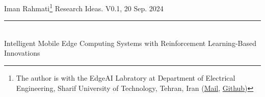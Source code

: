 \documentclass[12pt]{article}
\newcommand{\soptitle}{Intelligent Mobile Edge Computing Systems with Reinforcement Learning-Based Innovations}
\newcommand{\yourname}{Iman Rahmati}
\begin{document}
	

	
%


\begin{center} 
	
		\vspace{-17mm}
	
	\large Iman Rahmati\footnote{The author is with the EdgeAI Labratory at Department of Electrical Engineering, Sharif University of Technology, Tehran, Iran (\href{mailto:iman.rahmati@sharif.edu}{Mail}, \href{https://github.com/ImanRHT}{Github})} \hfill Research Ideas. V0.1, 20 Sep. 2024 \vspace{1mm} \hrule
	
	\vspace{-5mm}
	
	
	\noindent\Large 
	\textcolor{white}{i} \\ \LARGE\soptitle \vspace{6mm}\\
\end{center}
	
	




\vspace{-12mm}

\begin{abstract}
	\noindent
	Mobile edge computing often suffers from the dynamic and unknown nature of the environment such as time-varying conditions, heterogeneous devices, and frequent communication requests, imposing significant challenges on improving system performance. To meet the rapidly growing demands of computation-intensive and time-sensitive applications, Reinforcement learning (RL)\cite{mnih2015human} has been proposed as an effective tool to establish low-latency and energy-efficient networks. RL enables network entities to interact with the environment and learn an optimal decision-making policy, usually modeled as a Markov decision process (MDP)\cite{puterman2014markov}.\vspace{2mm}
	
	 \noindent\textit{\textbf{Terms—}} Mobile edge computing (MEC), Resource Management, Computation Offloading, Partially Observeble MDP (POMDP), Deep RL (DRL), Multi-Agent RL (MARL), Meta-RL, Federated RL
\end{abstract}
\end{document}
